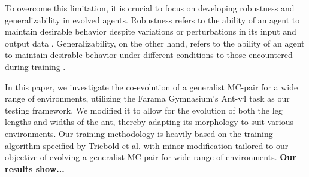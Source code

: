 To overcome this limitation, it is crucial to focus on developing robustness and generalizability in evolved agents. Robustness refers to the ability of an agent to maintain desirable behavior despite variations or perturbations in its input and output data \cite{Ravi_Mangal_2019, Charles_Packer_2019, Xu_Mengdi_2022}. Generalizability, on the other hand, refers to the ability of an agent to maintain desirable behavior under different conditions to those encountered during training \cite{Charles_Packer_2019,Xu_Mengdi_2022}. 

In this paper, we investigate the co-evolution of a generalist MC-pair for a wide range of environments, utilizing the Farama Gymnasium's Ant-v4 task \cite{Gymnasium2023} as our testing framework. We modified it to allow for the evolution of both the leg lengths and widths of the ant, thereby adapting its morphology to suit various environments. Our training methodology is heavily based on the training algorithm specified by Triebold et al. \cite{Corinna_Triebold} with minor modification tailored to our objective of evolving a generalist MC-pair for wide range of environments. \textbf{Our results show...}